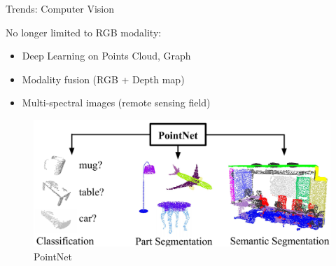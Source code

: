 \begin{frame}{Trends: Computer Vision}

	No longer limited to RGB modality:
	\begin{itemize}
		\item Deep Learning on Points Cloud, Graph
		\item Modality fusion (RGB + Depth map)~\cite{FUSENET}
		\item Multi-spectral images (remote sensing field)
	\end{itemize}
	\begin{figure}
		\includegraphics[width=0.6\linewidth]{images/pointnet.png}
		\caption{PointNet~\cite{POINTNET}}
	\end{figure}

\end{frame}